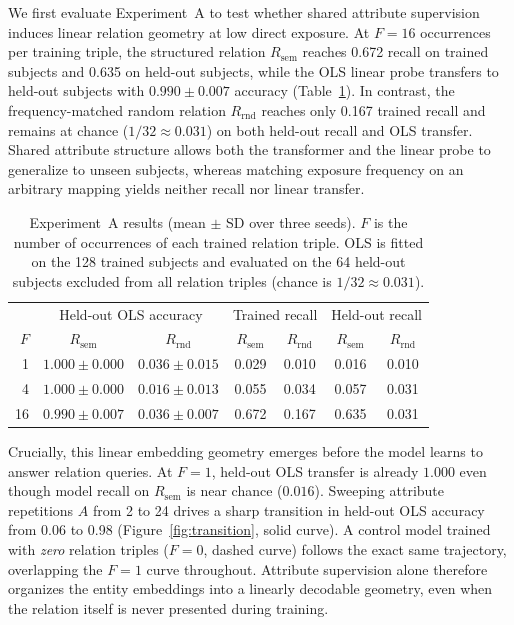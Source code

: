 \documentclass[11pt]{article}
\newcommand{\Rsem}{R_{\mathrm{sem}}}
\newcommand{\Rrnd}{R_{\mathrm{rnd}}}
\newcommand{\ExpOneTransitionLow}{0.06}
\newcommand{\ExpOneTransitionHigh}{0.98}
\newcommand{\ExpOneSemanticProbeStats}{0.990\pm0.007}
\newcommand{\ExpOneSemanticTrained}{0.672}
\newcommand{\ExpOneSemanticHeldout}{0.635}
\newcommand{\ExpOneRandomTrained}{0.167}
\begin{document}
We first evaluate Experiment~A to test whether shared attribute supervision
induces linear relation geometry at low direct exposure. At $F=16$ occurrences
per training triple, the structured relation $\Rsem$ reaches
\ExpOneSemanticTrained{} recall on trained subjects and \ExpOneSemanticHeldout{}
on held-out subjects, while the OLS linear probe transfers to held-out subjects
with $\ExpOneSemanticProbeStats$ accuracy (Table~\ref{tab:goal1}). In contrast,
the frequency-matched random relation $\Rrnd$ reaches only
\ExpOneRandomTrained{} trained recall and remains at chance ($1/32 \approx
0.031$) on both held-out recall and OLS transfer. Shared attribute structure
allows both the transformer and the linear probe to generalize to unseen
subjects, whereas matching exposure frequency on an arbitrary mapping yields
neither recall nor linear transfer.

\begin{table}[t]
\centering
\small
\begin{tabular}{rcccccc}
\toprule
& \multicolumn{2}{c}{Held-out OLS accuracy}
& \multicolumn{2}{c}{Trained recall}
& \multicolumn{2}{c}{Held-out recall} \\
$F$ & $\Rsem$ & $\Rrnd$ & $\Rsem$ & $\Rrnd$ & $\Rsem$ & $\Rrnd$ \\
\midrule
1 & $1.000\pm0.000$ & $0.036\pm0.015$ & 0.029 & 0.010 & 0.016 & 0.010 \\
4 & $1.000\pm0.000$ & $0.016\pm0.013$ & 0.055 & 0.034 & 0.057 & 0.031 \\
16 & $0.990\pm0.007$ & $0.036\pm0.007$ & 0.672 & 0.167 & 0.635 & 0.031 \\
\bottomrule
\end{tabular}
\caption{Experiment~A results (mean $\pm$ SD over three seeds). $F$ is the
number of occurrences of each trained relation triple. OLS is fitted on the 128
trained subjects and evaluated on the 64 held-out subjects excluded from all
relation triples (chance is $1/32 \approx 0.031$).}
\label{tab:goal1}
\end{table}

Crucially, this linear embedding geometry emerges before the model learns to
answer relation queries. At $F=1$, held-out OLS transfer is already $1.000$ even
though model recall on $\Rsem$ is near chance ($0.016$). Sweeping attribute
repetitions $A$ from 2 to 24 drives a sharp transition in held-out OLS accuracy
from \ExpOneTransitionLow{} to \ExpOneTransitionHigh{}
(Figure~\ref{fig:transition}, solid curve). A control model trained with
\emph{zero} relation triples ($F=0$, dashed curve) follows the exact same
trajectory, overlapping the $F=1$ curve throughout. Attribute supervision alone
therefore organizes the entity embeddings into a linearly decodable geometry,
even when the relation itself is never presented during training.
\end{document}
